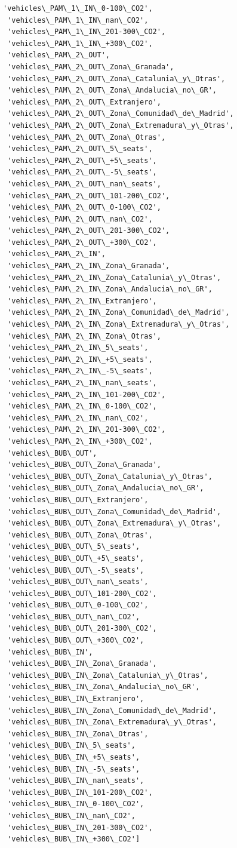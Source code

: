 \documentclass[11pt]{article}
\begin{document}
\begin{Verbatim}[commandchars=\\\{\}]
 'vehicles\_PAM\_1\_IN\_0-100\_CO2',
 'vehicles\_PAM\_1\_IN\_nan\_CO2',
 'vehicles\_PAM\_1\_IN\_201-300\_CO2',
 'vehicles\_PAM\_1\_IN\_+300\_CO2',
 'vehicles\_PAM\_2\_OUT',
 'vehicles\_PAM\_2\_OUT\_Zona\_Granada',
 'vehicles\_PAM\_2\_OUT\_Zona\_Catalunia\_y\_Otras',
 'vehicles\_PAM\_2\_OUT\_Zona\_Andalucia\_no\_GR',
 'vehicles\_PAM\_2\_OUT\_Extranjero',
 'vehicles\_PAM\_2\_OUT\_Zona\_Comunidad\_de\_Madrid',
 'vehicles\_PAM\_2\_OUT\_Zona\_Extremadura\_y\_Otras',
 'vehicles\_PAM\_2\_OUT\_Zona\_Otras',
 'vehicles\_PAM\_2\_OUT\_5\_seats',
 'vehicles\_PAM\_2\_OUT\_+5\_seats',
 'vehicles\_PAM\_2\_OUT\_-5\_seats',
 'vehicles\_PAM\_2\_OUT\_nan\_seats',
 'vehicles\_PAM\_2\_OUT\_101-200\_CO2',
 'vehicles\_PAM\_2\_OUT\_0-100\_CO2',
 'vehicles\_PAM\_2\_OUT\_nan\_CO2',
 'vehicles\_PAM\_2\_OUT\_201-300\_CO2',
 'vehicles\_PAM\_2\_OUT\_+300\_CO2',
 'vehicles\_PAM\_2\_IN',
 'vehicles\_PAM\_2\_IN\_Zona\_Granada',
 'vehicles\_PAM\_2\_IN\_Zona\_Catalunia\_y\_Otras',
 'vehicles\_PAM\_2\_IN\_Zona\_Andalucia\_no\_GR',
 'vehicles\_PAM\_2\_IN\_Extranjero',
 'vehicles\_PAM\_2\_IN\_Zona\_Comunidad\_de\_Madrid',
 'vehicles\_PAM\_2\_IN\_Zona\_Extremadura\_y\_Otras',
 'vehicles\_PAM\_2\_IN\_Zona\_Otras',
 'vehicles\_PAM\_2\_IN\_5\_seats',
 'vehicles\_PAM\_2\_IN\_+5\_seats',
 'vehicles\_PAM\_2\_IN\_-5\_seats',
 'vehicles\_PAM\_2\_IN\_nan\_seats',
 'vehicles\_PAM\_2\_IN\_101-200\_CO2',
 'vehicles\_PAM\_2\_IN\_0-100\_CO2',
 'vehicles\_PAM\_2\_IN\_nan\_CO2',
 'vehicles\_PAM\_2\_IN\_201-300\_CO2',
 'vehicles\_PAM\_2\_IN\_+300\_CO2',
 'vehicles\_BUB\_OUT',
 'vehicles\_BUB\_OUT\_Zona\_Granada',
 'vehicles\_BUB\_OUT\_Zona\_Catalunia\_y\_Otras',
 'vehicles\_BUB\_OUT\_Zona\_Andalucia\_no\_GR',
 'vehicles\_BUB\_OUT\_Extranjero',
 'vehicles\_BUB\_OUT\_Zona\_Comunidad\_de\_Madrid',
 'vehicles\_BUB\_OUT\_Zona\_Extremadura\_y\_Otras',
 'vehicles\_BUB\_OUT\_Zona\_Otras',
 'vehicles\_BUB\_OUT\_5\_seats',
 'vehicles\_BUB\_OUT\_+5\_seats',
 'vehicles\_BUB\_OUT\_-5\_seats',
 'vehicles\_BUB\_OUT\_nan\_seats',
 'vehicles\_BUB\_OUT\_101-200\_CO2',
 'vehicles\_BUB\_OUT\_0-100\_CO2',
 'vehicles\_BUB\_OUT\_nan\_CO2',
 'vehicles\_BUB\_OUT\_201-300\_CO2',
 'vehicles\_BUB\_OUT\_+300\_CO2',
 'vehicles\_BUB\_IN',
 'vehicles\_BUB\_IN\_Zona\_Granada',
 'vehicles\_BUB\_IN\_Zona\_Catalunia\_y\_Otras',
 'vehicles\_BUB\_IN\_Zona\_Andalucia\_no\_GR',
 'vehicles\_BUB\_IN\_Extranjero',
 'vehicles\_BUB\_IN\_Zona\_Comunidad\_de\_Madrid',
 'vehicles\_BUB\_IN\_Zona\_Extremadura\_y\_Otras',
 'vehicles\_BUB\_IN\_Zona\_Otras',
 'vehicles\_BUB\_IN\_5\_seats',
 'vehicles\_BUB\_IN\_+5\_seats',
 'vehicles\_BUB\_IN\_-5\_seats',
 'vehicles\_BUB\_IN\_nan\_seats',
 'vehicles\_BUB\_IN\_101-200\_CO2',
 'vehicles\_BUB\_IN\_0-100\_CO2',
 'vehicles\_BUB\_IN\_nan\_CO2',
 'vehicles\_BUB\_IN\_201-300\_CO2',
 'vehicles\_BUB\_IN\_+300\_CO2']
    \end{Verbatim}
\end{document}
